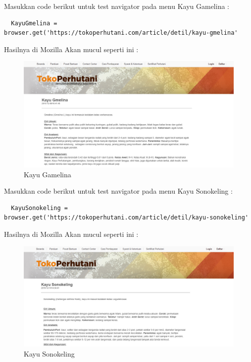 Masukkan code berikut untuk test navigator pada menu Kayu Gamelina :
\begin{verbatim}
  KayuGmelina = browser.get('https://tokoperhutani.com/article/detil/kayu-gmelina'
\end{verbatim}

Hasilnya  di Mozilla Akan mucul seperti ini :
\begin{figure}[h]
\centering
\includegraphics[scale=0.3]{figures/2.2}
\caption{Kayu Gamelina}
\end{figure}

Masukkan code berikut untuk test navigator pada menu Kayu Sonokeling :
\begin{verbatim}
  KayuSonokeling = browser.get('https://tokoperhutani.com/article/detil/kayu-sonokeling'
\end{verbatim}

Hasilnya  di Mozilla Akan mucul seperti ini :
\begin{figure}[h]
\centering
\includegraphics[scale=0.3]{figures/3.2}
\caption{Kayu Sonokeling}
\end{figure}

